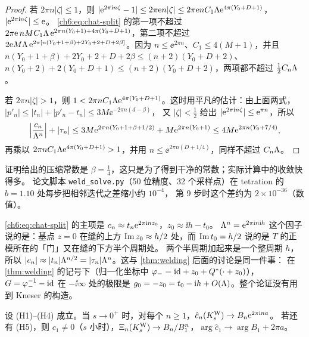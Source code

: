 \begin{proof}
若 $2\pi n|\zeta|\le1$，则 $|\mathrm{e}^{2\pi\mathrm{i} n\zeta}-1|\le2\pi\mathrm{e} n|\zeta|\le2\pi\mathrm{e} nC_1\Lambda\mathrm{e}^{4\pi(Y_0+D+1)}$，$|\mathrm{e}^{2\pi\mathrm{i} n\zeta}|\le\mathrm{e}$。
\eqref{ch6:eq:chat-split} 的第一项不超过 $2\pi\mathrm{e}\,nMC_1\Lambda\,\mathrm{e}^{2\pi n(Y_0+1)+4\pi(Y_0+D+1)}$，第二项不超过
$2\mathrm{e} M\Lambda\,\mathrm{e}^{2\pi[n(Y_0+1+\beta)+2Y_0+2+D+2\beta]}$。因为 $n\le\ee^{2\pi n}$、$C_1\le4(M+1)$，并且
$n(Y_0+1+\beta)+2Y_0+2+D+2\beta\le(n+2)(Y_0+D+2)$、$n(Y_0+2)+2(Y_0+D+1)\le(n+2)(Y_0+D+2)$，两项都不超过 $\tfrac12C_n\Lambda$。

若 $2\pi n|\zeta|>1$，则 $1<2\pi nC_1\Lambda\mathrm{e}^{4\pi(Y_0+D+1)}$。这时用平凡的估计：由上面两式，$|p'_n|\le|t_n|+|p'_n-t_n|\le3M\ee^{-2\pi n(d-\beta)}$，
又 $|\zeta|<\tfrac12$ 给出 $|\mathrm{e}^{2\pi\mathrm{i} n\zeta}|\le\mathrm{e}^{\pi n}$，所以
\[
 \Bigl|\frac{c_n}{\Lambda^n}\Bigr|+|\tau_n|\le3M\mathrm{e}^{2\pi n(Y_0+1+\beta+1/2)}+M\mathrm{e}^{2\pi n(Y_0+1)}\le4M\mathrm{e}^{2\pi n(Y_0+7/4)},
\]
再乘以 $2\pi nC_1\Lambda\mathrm{e}^{4\pi(Y_0+D+1)}>1$，并用 $n\le\ee^{2\pi n(D+1/4)}$，同样不超过 $C_n\Lambda$。
\end{proof}

\begin{remark}[压缩率]\label{ch6:rem:rate}
证明给出的压缩常数是 $\beta=\tfrac14$，这只是为了得到干净的常数；实际计算中的收敛快得多。
论文脚本 \texttt{weld\_solve.py}（50 位精度、32 个采样点）在 tetration 的 $b=1.10$ 处每步把相邻迭代之差缩小约 $10^{-4}$，
第 9 步时这个差约为 $2\times10^{-36}$（数值）。
\end{remark}

\begin{remark}\label{ch6:rem:Lambda}
\eqref{ch6:eq:chat-split} 的主项是 $c_n\approx t_n\mathrm{e}^{2\pi\mathrm{i} nz_0}$，$z_0\approx\ii h-t_0$。
$\Lambda^n=\mathrm{e}^{2\pi\mathrm{i} n\mathrm{i} h}$ 这个因子说的是：基点 $z=0$ 在缝的上方 $\operatorname{Im} z_0\approx h/2$ 处，而 $\operatorname{Im} t_0=h/2$ 说的是 $T$ 的正模所在的「门」又在缝的下方半个周期处。
两个半周期加起来是一个整周期 $h$，所以 $|c_n|\approx|t_n|\Lambda^{n/2}=|\tau_n|\Lambda^n$。这与 \cref{thm:welding} 后面的讨论是同一件事：
在 \cref{thm:welding} 的记号下（归一化坐标中 $\varphi_-=\mathrm{id}+z_0+Q^*(\cdot+z_0)$），$G=\varphi_-^{-1}-\mathrm{id}$ 在 $-\ii\infty$ 处的极限是 $g_0=-z_0=t_0-\mathrm{i} h+O(\Lambda)$。整个论证没有用到 Kneser 的构造。
\end{remark}

\begin{corollary}\label{ch6:cor:limits}
设 \textup{(H1)--(H4)} 成立。当 $s\to0^+$ 时，对每个 $n\ge1$，$\hat c_n(K^{\mathrm W}_s)\to B_n\mathrm{e}^{2\pi\mathrm{i} na}$。
若还有 \textup{(H5)}，则 $c_1\ne0$（$s$ 小时），$\Xi_n(K^{\mathrm W}_s)\to B_n/B_1^n$，$\arg\hat c_1\to\arg B_1+2\pi a$。
\end{corollary}

